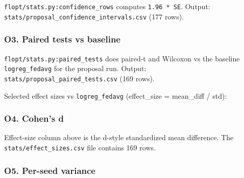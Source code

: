 \documentclass{article}
\begin{document}
\texttt{flopt/stats.py:confidence\_rows} computes \texttt{1.96 * SE}. Output: \texttt{stats/proposal\_confidence\_intervals.csv} (177 rows).


\subsubsection{O3. Paired tests vs baseline}


\texttt{flopt/stats.py:paired\_tests} does paired-t and Wilcoxon vs the baseline \texttt{logreg\_fedavg} for the proposal run. Output: \texttt{stats/proposal\_paired\_tests.csv} (169 rows).


Selected effect sizes vs \texttt{logreg\_fedavg} (effect\_size = mean\_diff / std):


\begin{table}[H]
  \centering
  \small
\end{table}


\subsubsection{O4. Cohen's d}


Effect-size column above is the d-style standardized mean difference. The \texttt{stats/effect\_sizes.csv} file contains 169 rows.


\subsubsection{O5. Per-seed variance}
\end{document}
